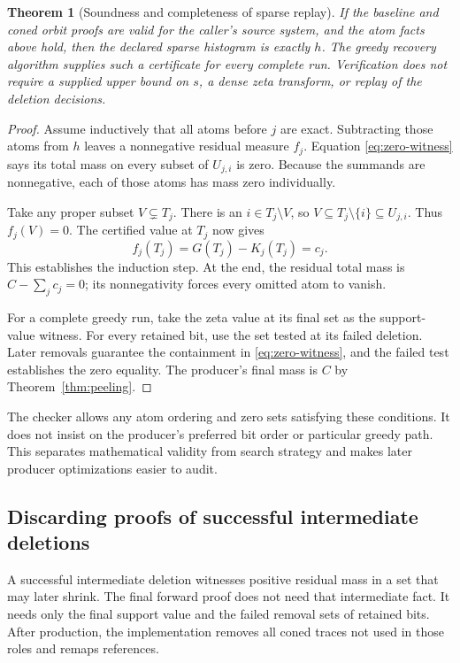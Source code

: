 \documentclass[11pt,letterpaper]{article}
\newtheorem{theorem}{Theorem}[section]
\theoremstyle{definition}
\begin{document}
\begin{theorem}[Soundness and completeness of sparse replay]\label{thm:certificate}
If the baseline and coned orbit proofs are valid for the caller's source
system, and the atom facts above hold, then the declared sparse histogram is
exactly $h$. The greedy recovery algorithm supplies such a certificate for
every complete run. Verification does not require a supplied upper bound on
$s$, a dense zeta transform, or replay of the deletion decisions.
\end{theorem}
\begin{proof}
Assume inductively that all atoms before $j$ are exact. Subtracting those
atoms from $h$ leaves a nonnegative residual measure $f_j$. Equation
\eqref{eq:zero-witness} says its total mass on every subset of $U_{j,i}$ is
zero. Because the summands are nonnegative, each of those atoms has mass
zero individually.

Take any proper subset $V\subsetneq T_j$. There is an
$i\in T_j\setminus V$, so $V\subseteq T_j\setminus\{i\}\subseteq U_{j,i}$.
Thus $f_j(V)=0$. The certified value at $T_j$ now gives
\[
 f_j(T_j)=G(T_j)-K_j(T_j)=c_j.
\]
This establishes the induction step. At the end, the residual total mass is
$C-\sum_jc_j=0$; its nonnegativity forces every omitted atom to vanish.

For a complete greedy run, take the zeta value at its final set as the
support-value witness. For every retained bit, use the set tested at its
failed deletion. Later removals guarantee the containment in
\eqref{eq:zero-witness}, and the failed test establishes the zero equality.
The producer's final mass is $C$ by Theorem~\ref{thm:peeling}.
\end{proof}

The checker allows any atom ordering and zero sets satisfying these
conditions. It does not insist on the producer's preferred bit order or
particular greedy path. This separates mathematical validity from search
strategy and makes later producer optimizations easier to audit.

\subsection{Discarding proofs of successful intermediate deletions}
A successful intermediate deletion witnesses positive residual mass in a
set that may later shrink. The final forward proof does not need that
intermediate fact. It needs only the final support value and the failed
removal sets of retained bits. After production, the implementation removes
all coned traces not used in those roles and remaps references.
\end{document}
